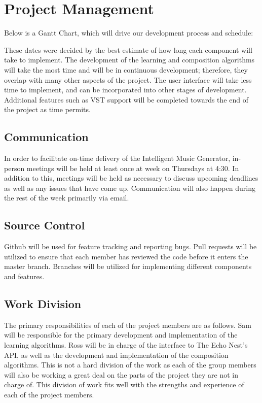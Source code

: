 \documentclass{article}
\begin{document}
\section{Project Management}
Below is a Gantt Chart, which will drive our development process and schedule:
\begin{figure}[ht]
\end{figure}
These dates were decided by the best estimate of how long each component will take to implement.  The development of the learning and composition algorithms will take the most time and will be in continuous development; therefore, they overlap with many other aspects of the project.  The user interface will take less time to implement, and can be incorporated into other stages of development.  Additional features such as VST support will be completed towards the end of the project as time permits.

\subsection{Communication}
In order to facilitate on-time delivery of the Intelligent Music Generator, in-person meetings will be held at least once at week on Thursdays at 4:30. In addition to this, meetings will be held as necessary to discuss upcoming deadlines as well as any issues that have come up. Communication will also happen during the rest of the week primarily via email.

\subsection{Source Control}
Github will be used for feature tracking and reporting bugs.  Pull requests will be utilized to ensure that each member has reviewed the code before it enters the master branch.  Branches will be utilized for implementing different components and features.

\subsection{Work Division}
The primary responsibilities of each of the project members are as follows. Sam will be responsible for the primary development and implementation of the learning algorithms. Ross will be in charge of the interface to The Echo Nest's API, as well as the development and implementation of the composition algorithms. This is not a hard division of the work as each of the group members will also be working a great deal on the parts of the project they are not in charge of. This division of work fits well with the strengths and experience of each of the project members.
\end{document}
